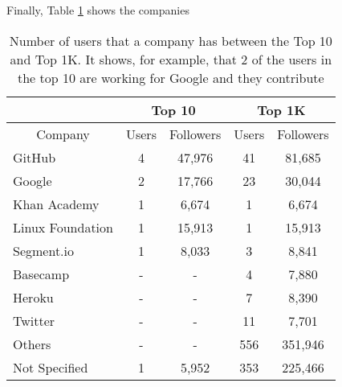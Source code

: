 Finally, Table \ref{tbl:topcompanies} shows the companies 
\begin{table}
\centering
\begin{tabular}{ | l | c | c | c | c | }
	\hline
	\- & \multicolumn{2}{|c|}{Top 10} & \multicolumn{2}{|c|}{Top 1K} \\ \hline
	\multicolumn{1}{|c|}{Company} & Users & Followers & Users & Followers \\ \hline
	GitHub & 4 & 47,976 & 41 & 81,685 \\ \hline
	Google & 2 & 17,766 & 23 & 30,044 \\ \hline
	Khan Academy & 1 & 6,674 & 1 & 6,674 \\ \hline
	Linux Foundation & 1 & 15,913 & 1 & 15,913 \\ \hline
	Segment.io & 1 & 8,033 & 3 & 8,841 \\ \hline
	Basecamp & - & - & 4 & 7,880 \\ \hline
	Heroku & - & - & 7 & 8,390 \\ \hline
	Twitter & - & - & 11 & 7,701 \\ \hline
	Others & - & - & 556 & 351,946 \\ \hline
	Not Specified & 1 & 5,952 & 353 & 225,466 \\ \hline
\end{tabular}
\caption{Number of users that a company has between the Top 10 and Top 1K. It shows, for example, that 2 of the users in the top 10 are working for Google and they contribute }
\label{tbl:topcompanies}
\end{table}
